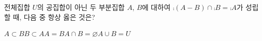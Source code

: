 전체집합 $U$의 공집합이 아닌 두 부분집합 $A$, $B$에 대하여 $\comp{(A-B)}\cap\comp{B}=\comp{A}$가 성립할 때, 다음 중 항상 옳은 것은?
\begin{choices32}{$A\subset B$}{$B\subset A$}{$A=B$}{$A\cap B=\varnothing$}{$A\cup B=U$}\end{choices32}
